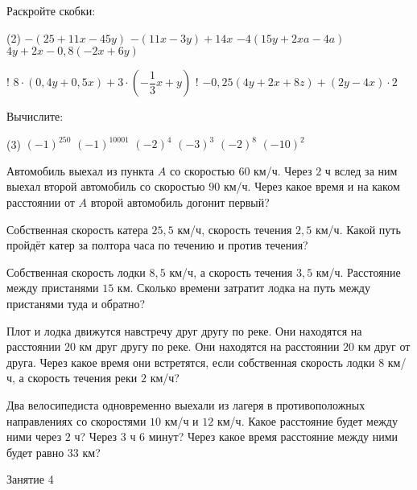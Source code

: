 \begin{class}[number=3-4]
	\begin{listofex}
		\item Раскройте скобки:
		\begin{tasks}(2)
			\task \( -(25+11x-45y) \)
			\task \( -(11x-3y)+14x \)
			\task \( -4(15y+2xa-4a) \)
			\task \( 4y+2x-0,8(-2x+6y) \)
			
			\task! \( 8 \cdot (0,4y+0,5x)+3 \cdot \left( -\dfrac{ 1 }{ 3 }x + y \right) \)
			\task! \( -0,25(4y+2x+8z)+(2y-4x)\cdot 2 \)
		\end{tasks}
		\item Вычислите:
		\begin{tasks}(3)
			\task \( (-1)^{250} \)
			\task \( (-1)^{10001} \)
			\task \( (-2)^{4} \)
			\task \( (-3)^3 \)
			\task \( (-2)^8 \)
			\task \( (-10)^2 \)
		\end{tasks}
		\item Автомобиль выехал из пункта \(A\) со скоростью \(60\) км/ч. Через \(2\) ч вслед за ним выехал второй автомобиль со скоростью \(90\) км/ч. Через какое время и на каком расстоянии от \(A\) второй автомобиль догонит первый?
		\item Собственная скорость катера \(25,5\) км/ч, скорость течения \(2,5\) км/ч. Какой путь пройдёт катер за полтора часа по течению и против течения?
		\item Собственная скорость лодки \(8,5\) км/ч, а скорость течения \(3,5\) км/ч. Расстояние между пристанями \(15\) км. Сколько времени затратит лодка на путь между пристанями туда и обратно?
		\item Плот и лодка движутся навстречу друг другу по реке. Они находятся на расстоянии \(20\) км друг другу по реке. Они находятся на расстоянии \(20\) км друг от друга. Через какое время они встретятся, если собственная скорость лодки \(8\) км/ч, а скорость течения реки \(2\) км/ч?
		\item Два велосипедиста одновременно выехали из лагеря в противоположных направлениях со скоростями \(10\) км/ч и \(12\) км/ч. Какое расстояние будет между ними через \(2\) ч? Через \(3\) ч \(6\) минут? Через какое время расстояние между ними будет равно \(33\) км?
	\end{listofex}
\end{class}

\begin{class}[number=4]
	\begin{listofex}
		\item Занятие 4
	\end{listofex}
\end{class}

